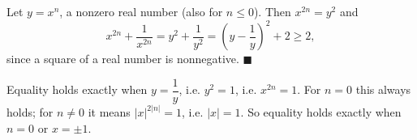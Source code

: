 Let $y=x^n$, a nonzero real number (also for $n\le0$). Then $x^{2n}=y^2$ and
\[x^{2n}+\dfrac1{x^{2n}}=y^2+\dfrac1{y^2}=\left(y-\dfrac1y\right)^2+2\ge2,\]
since a square of a real number is nonnegative. $\blacksquare$

Equality holds exactly when $y=\dfrac1y$, i.e. $y^2=1$, i.e. $x^{2n}=1$. For $n=0$ this always holds; for $n\ne0$ it means $|x|^{2|n|}=1$, i.e. $|x|=1$. So equality holds exactly when $\boxed{n=0\text{ or }x=\pm1}$.
